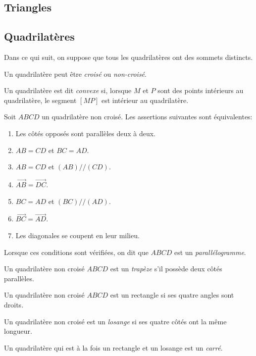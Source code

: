 \subsection{Triangles}

\subsection{Quadrilatères}

Dans ce qui suit, on suppose que tous les quadrilatères ont des sommets distincts.

Un quadrilatère peut être \emph{croisé} ou \emph{non-croisé}.

\begin{definition}
Un quadrilatère est dit \emph{convexe} si, lorsque $M$ et $P$ sont des points intérieurs au quadrilatère, le segment $[MP]$ est intérieur au quadrilatère.
\end{definition}

\begin{propdef}
Soit $ABCD$ un quadrilatère non croisé. Les assertions suivantes sont équivalentes:
\begin{enumerate}
\item Les côtés opposés sont parallèles deux à deux.
\item $AB=CD$ et $BC=AD$.
\item $AB=CD$ et $(AB)//(CD)$.
\item $\vec{AB}=\vec{DC}$.
\item $BC=AD$ et $(BC)//(AD)$.
\item $\vec{BC}=\vec{AD}$.
\item Les diagonales se coupent en leur milieu.
\end{enumerate}

Lorsque ces conditions sont vérifiées, on dit que $ABCD$ est un \emph{parallélogramme}.
\end{propdef}

\begin{definition}
Un quadrilatère non croisé $ABCD$ est un \emph{trapèze} s'il possède deux côtés parallèles.
\end{definition}

\begin{definition}
Un quadrilatère non croisé $ABCD$ est un rectangle si ses quatre angles sont droits.
\end{definition}

\begin{definition}
Un quadrilatère non croisé est un \emph{losange} si ses quatre côtés ont la même longueur.
\end{definition}

\begin{definition}
Un quadrilatère qui est à la fois un rectangle et un losange est un \emph{carré}.
\end{definition}